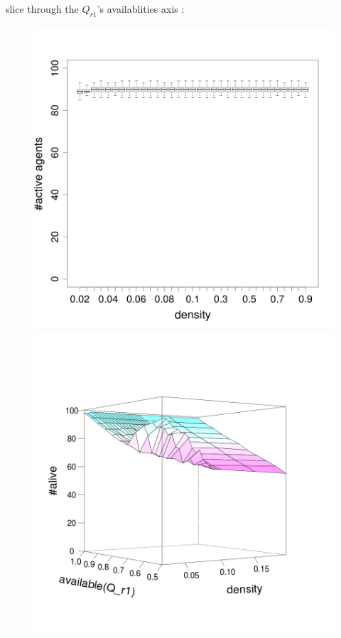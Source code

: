 \documentclass[8pt, handout=show,notes=show]{beamer}
\begin{document}
\begin{frame}{slice through the $Q_{r1}$'s availablities axis : }
\begin{figure}[H]
\includegraphics[width=\imgSize]{images/alive_density_r1-90.png}
\includegraphics[width=\imgSize]{images/active_median}
\end{figure}

\end{frame}
\end{document}
